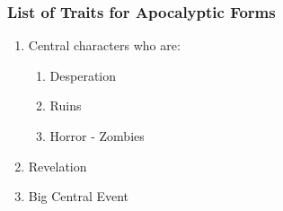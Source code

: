 
\subsubsection{List of Traits for Apocalyptic Forms}
\label{sub_sub_sec:list_of_traits_for_apocalyptic_forms}

\begin{enumerate}
  \label{enum:list_of_traits_for_apocalyptic_forms}

  \item Central characters who are:

    \begin{enumerate}
      \label{enum:list_of_traits_for_apocalyptic_forms_2}

      \item Desperation
      \item Ruins
      \item Horror - Zombies
    \end{enumerate}

  \item Revelation 
  \item Big Central Event 
\end{enumerate}


\newpage
